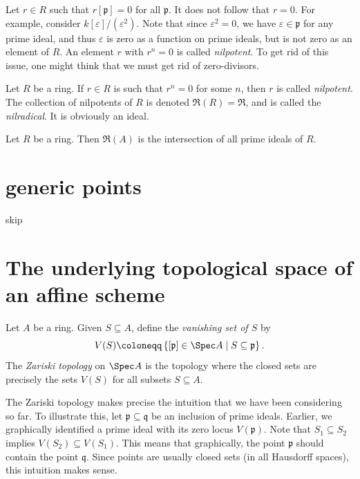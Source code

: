 Let $r\in R$ such that $r[\mathfrak{p} ]=0$ for all $\mathfrak{p} $. It does not follow that $r=0$. For example, consider $k[\varepsilon ] / (\varepsilon ^2)$. Note that since $\varepsilon ^2=0$, we have $\varepsilon \in \mathfrak{p} $ for any prime ideal, and thus $\varepsilon $ is zero as a function on prime ideals, but is not zero as an element of $R$. An element $r$ with $r^n=0$ is called \emph{nilpotent}. To get rid of this issue, one might think that we must get rid of zero-divisors.

\begin{definition}\label{dfn:3-2-10}
	Let $R$ be a ring. If $r\in R$ is such that $r^n=0$ for some $n$, then $r$ is called \emph{nilpotent}. The collection of nilpotents of $R$ is denoted $\mathfrak{R} (R) = \mathfrak{R} $, and is called the \emph{nilradical}. It is obviously an ideal.
\end{definition}
\begin{theorem}\label{thm:3-2-11}
	Let $R$ be a ring. Then $\mathfrak{R}(A)$ is the intersection of all prime ideals of $R$.
\end{theorem}

\section{generic points}

skip

\section{The underlying topological space of an affine scheme}

\begin{definition}\label{dfn:3-4-1}
	Let $A$ be a ring. Given $S\subseteq A$, define the \emph{vanishing set of $S$} by
	\[
		V(S) \coloneqq \left\{ [\mathfrak{p} ]\in \Spec A \mid S \subseteq \mathfrak{p}  \right\} 
	.\]
	The \emph{Zariski topology} on $\Spec A$ is the topology where the closed sets are precisely the sets $V(S)$ for all subsets $S\subseteq A$.
\end{definition}

The Zariski topology makes precise the intuition that we have been considering so far. To illustrate this, let $\mathfrak{p} \subseteq \mathfrak{q} $ be an inclusion of prime ideals. Earlier, we graphically identified a prime ideal with its zero locus $V(\mathfrak{p} )$. Note that $S_1 \subseteq S_2$ implies $V(S_2) \subseteq V(S_1)$. This means that graphically, the point $\mathfrak{p} $ should contain the point $\mathfrak{q} $. Since points are usually closed sets (in all Hausdorff spaces), this intuition makes sense.

